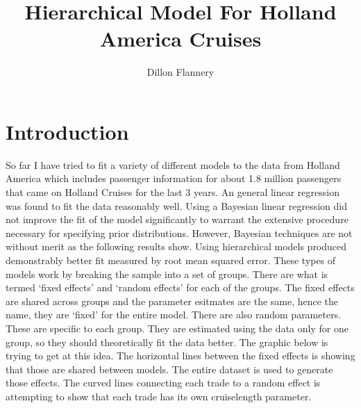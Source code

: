 \documentclass{article}
\author{Dillon Flannery}
\title{Hierarchical Model For Holland America Cruises}
\begin{document}
	\maketitle
		\tableofcontents
		\newpage
	\section{Introduction} So far I have tried to fit a variety of different models to the data from Holland America which includes passenger information for about 1.8 million passengers that came on Holland Cruises for the last 3 years. An general linear regression was found to fit the data reasonably well. Using a Bayesian linear regression did not improve the fit of the model significantly to warrant the extensive procedure necessary for specifying prior distributions. However, Bayesian techniques are not without merit as the following results show. Using hierarchical models produced demonstrably better fit measured by root mean squared error. These types of models work by breaking the sample into a set of groups. There are what is termed `fixed effects' and `random effects' for each of the groups. The fixed effects are shared across groups and the parameter esitmates are the same, hence the name, they are `fixed' for the entire model. There are also random parameters. These are specific to each group. They are estimated using the data only for one group, so they should theoretically fit the data better. The graphic below is trying to get at this idea. The horizontal lines between the fixed effects is showing that those are shared between models. The entire dataset is used to generate those effects. The curved lines connecting each trade to a random effect is attempting to show that each trade has its own cruiselength parameter. \\
\end{document}
